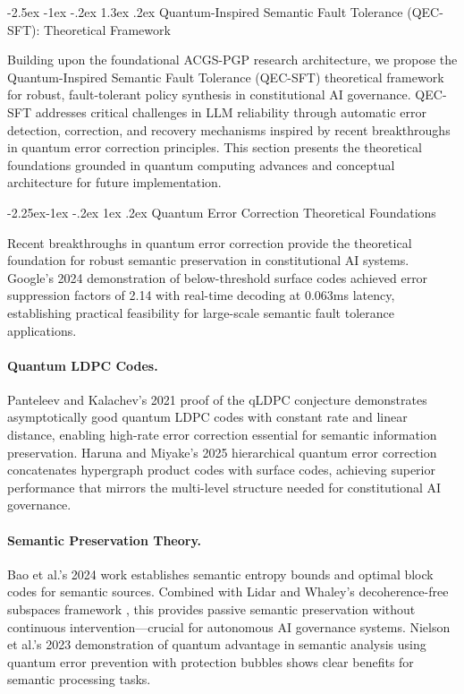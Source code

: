 \documentclass[manuscript,screen,9pt]{acmart}
\makeatletter
\renewcommand\section{\@startsection{section}{1}{\z@}%
  {-2.5ex \@plus -1ex \@minus -.2ex}%
  {1.3ex \@plus.2ex}%
  {\normalfont\Large\bfseries}}
\renewcommand\subsection{\@startsection{subsection}{2}{\z@}%
  {-2.25ex\@plus -1ex \@minus -.2ex}%
  {1ex \@plus .2ex}%
  {\normalfont\large\bfseries}}
\makeatother
\begin{document}
\begin{table}[!htb]
\section{Quantum-Inspired Semantic Fault Tolerance (QEC-SFT): Theoretical Framework}
\label{sec:qec_sft}

Building upon the foundational ACGS-PGP research architecture, we propose the Quantum-Inspired Semantic Fault Tolerance (QEC-SFT) theoretical framework for robust, fault-tolerant policy synthesis in constitutional AI governance. QEC-SFT addresses critical challenges in LLM reliability through automatic error detection, correction, and recovery mechanisms inspired by recent breakthroughs in quantum error correction principles. This section presents the theoretical foundations grounded in quantum computing advances and conceptual architecture for future implementation.

\subsection{Quantum Error Correction Theoretical Foundations}
\label{subsec:qec_foundations}

Recent breakthroughs in quantum error correction provide the theoretical foundation for robust semantic preservation in constitutional AI systems. Google's 2024 demonstration of below-threshold surface codes \cite{Acharya2024QuantumErrorCorrection} achieved error suppression factors of 2.14 with real-time decoding at 0.063ms latency, establishing practical feasibility for large-scale semantic fault tolerance applications.

\paragraph{Quantum LDPC Codes.} Panteleev and Kalachev's 2021 proof of the qLDPC conjecture \cite{Panteleev2021QuantumLDPC} demonstrates asymptotically good quantum LDPC codes with constant rate and linear distance, enabling high-rate error correction essential for semantic information preservation. Haruna and Miyake's 2025 hierarchical quantum error correction \cite{Haruna2025HierarchicalQEC} concatenates hypergraph product codes with surface codes, achieving superior performance that mirrors the multi-level structure needed for constitutional AI governance.

\paragraph{Semantic Preservation Theory.} Bao et al.'s 2024 work \cite{Bao2024SemanticEntropy} establishes semantic entropy bounds and optimal block codes for semantic sources. Combined with Lidar and Whaley's decoherence-free subspaces framework \cite{Lidar2024DecoherenceFree}, this provides passive semantic preservation without continuous intervention—crucial for autonomous AI governance systems. Nielson et al.'s 2023 demonstration \cite{Nielson2023QuantumAdvantage} of quantum advantage in semantic analysis using quantum error prevention with protection bubbles shows clear benefits for semantic processing tasks.


\end{table}
\end{document}
